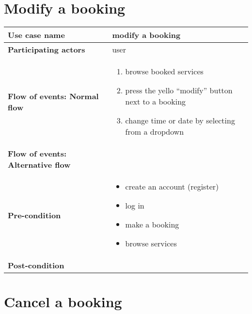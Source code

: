 \documentclass[a4paper, 13pt, draft]{report}
\begin{document}
\section*{Modify a booking}

\begin{center}
    \begin{tabular}{| >{\bf}l | p{5.55cm} |} 
	\hline
	Use case name & modify a booking \\ 
	\hline
	Participating actors & user \\
	\hline
	Flow of events: Normal flow & 
	\begin{enumerate}		
	    \item browse booked services
	    \item press the yello ``modify'' button next to a booking
	    \item change time or date by selecting from a dropdown
	\end{enumerate}	\\
	\hline
	Flow of events: Alternative flow & \notapplicable \\
	\hline
	Pre-condition & 
	\begin{itemize} 
	    \item create an account (register)
	    \item log in
	    \item make a booking
	    \item browse services
	\end{itemize} \\
	\hline
	Post-condition & \notapplicable \\
	\hline
    \end{tabular}
\end{center}

\section*{Cancel a booking}
\end{document}
